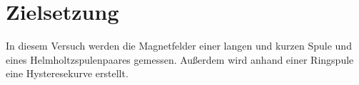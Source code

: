 \section{Zielsetzung}
\label{sec:Zielsetzung}

In diesem Versuch werden die Magnetfelder einer langen und kurzen Spule und eines Helmholtzspulenpaares gemessen. Außerdem wird anhand einer Ringspule eine Hysteresekurve erstellt.